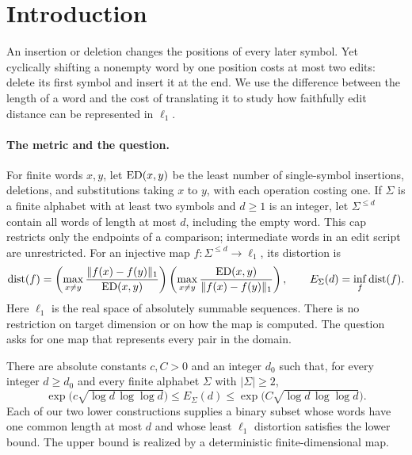 \section{Introduction}\label{sec:introduction}

An insertion or deletion changes the positions of every later symbol.
Yet cyclically shifting a nonempty word by one position costs at most two edits: delete its first
symbol and insert it at the end. We use the difference between the length of
a word and the cost of translating it to study how faithfully edit distance
can be represented in $\ell_1$.

\paragraph{The metric and the question.}
For finite words $x,y$, let $\operatorname{ED}(x,y)$ be the least number of single-symbol
insertions, deletions, and substitutions taking $x$ to $y$, with each
operation costing one. If $\Sigma$ is a finite alphabet with at least two
symbols and $d\geq1$ is an
integer, let $\Sigma^{\leq d}$ contain all words of length at most $d$,
including the empty word. This cap restricts only the endpoints of a
comparison; intermediate words in an edit script are unrestricted.
For an injective map $f:\Sigma^{\leq d}\to\ell_1$, its distortion is
\[
 \operatorname{dist}(f)=
 \left(\max_{x\ne y}\frac{\|f(x)-f(y)\|_1}{\operatorname{ED}(x,y)}\right)
 \left(\max_{x\ne y}\frac{\operatorname{ED}(x,y)}{\|f(x)-f(y)\|_1}\right),
 \qquad E_\Sigma(d)=\inf_f\operatorname{dist}(f).
\]
Here $\ell_1$ is the real space of absolutely summable sequences. There is
no restriction on target dimension or on how the map is computed. The
question asks for one map that represents every pair in the domain.

\begin{theorem}\label{thm:main}
There are absolute constants $c,C>0$ and an integer $d_0$ such that, for
every integer $d\geq d_0$ and every finite alphabet $\Sigma$ with
$|\Sigma|\geq2$,
\begin{equation}\label{eq:main}
 \exp\!\bigl(c\sqrt{\log d\,\log\log d}\bigr)
 \leq E_\Sigma(d)\leq
 \exp\!\bigl(C\sqrt{\log d\,\log\log d}\bigr).
\end{equation}
Each of our two lower constructions supplies a binary subset whose words
have one common length at most $d$ and whose least $\ell_1$ distortion
satisfies the lower bound. The upper bound is realized by a deterministic
finite-dimensional map.
\end{theorem}

